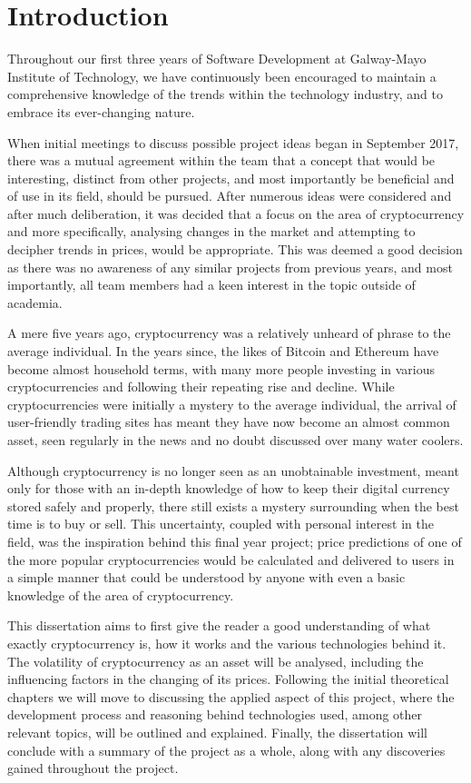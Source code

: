\chapter{Introduction}\label{intro}

Throughout our first three years of Software Development at Galway-Mayo Institute of Technology, we have continuously been encouraged to maintain a comprehensive knowledge of the trends within the technology industry, and to embrace its ever-changing nature.

When initial meetings to discuss possible project ideas began in September 2017, there was a mutual agreement within the team that a concept that would be interesting, distinct from other projects, and most importantly be beneficial and of use in its field, should be pursued. After numerous ideas were considered and after much deliberation, it was decided that a focus on the area of cryptocurrency and more specifically, analysing changes in the market and attempting to decipher trends in prices, would be appropriate. This was deemed a good decision as there was no awareness of any similar projects from previous years, and most importantly, all team members had a keen interest in the topic outside of academia.

A mere five years ago, cryptocurrency was a relatively unheard of phrase to the average individual. In the years since, the likes of Bitcoin and Ethereum have become almost household terms, with many more people investing in various cryptocurrencies and following their repeating rise and decline. While cryptocurrencies were initially a mystery to the average individual, the arrival of user-friendly trading sites has meant they have now become an almost common asset, seen regularly in the news and no doubt discussed over many water coolers. 

Although cryptocurrency is no longer seen as an unobtainable investment, meant only for those with an in-depth knowledge of how to keep their digital currency stored safely and properly, there still exists a mystery surrounding when the best time is to buy or sell. This uncertainty, coupled with personal interest in the field, was the inspiration behind this final year project; price predictions of one of the more popular cryptocurrencies would be calculated and delivered to users in a simple manner that could be understood by anyone with even a basic knowledge of the area of cryptocurrency.

This dissertation aims to first give the reader a good understanding of what exactly cryptocurrency is, how it works and the various technologies behind it. The volatility of cryptocurrency as an asset will be analysed, including the influencing factors in the changing of its prices. Following the initial theoretical chapters we will move to discussing the applied aspect of this project, where the development process and reasoning behind technologies used, among other relevant topics, will be outlined and explained. Finally, the dissertation will conclude with a summary of the project as a whole, along with any discoveries gained throughout the project.


